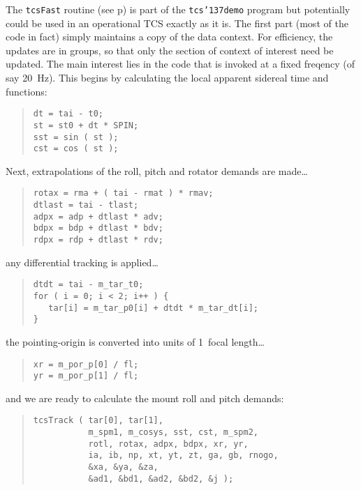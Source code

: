 \documentclass[12pt,fleqn,twoside]{article}
\renewcommand{\_}{{\tt\char'137}}     %
\begin{document}
The {\tt tcsFast} routine (see p\pageref{tcsFast})
is part of the {\tt tcs\_demo} program but
potentially could be used in an operational TCS exactly as it is.
The first part (most of the code in fact) simply maintains a copy of the
data context.  For efficiency,
the updates are in groups, so that only the section of
context of interest need be updated.  The main interest lies in the
code that is invoked at a fixed freqency (of say 20~Hz).  This begins
by calculating the local apparent sidereal time and functions:
\begin{quote}
\begin{small}
\begin{verbatim}
dt = tai - t0;
st = st0 + dt * SPIN;
sst = sin ( st );
cst = cos ( st );
\end{verbatim}\end{small}
\end{quote}
Next, extrapolations of the roll, pitch and
rotator demands are made\ldots
\begin{quote}
\begin{small}
\begin{verbatim}
rotax = rma + ( tai - rmat ) * rmav;
dtlast = tai - tlast;
adpx = adp + dtlast * adv;
bdpx = bdp + dtlast * bdv;
rdpx = rdp + dtlast * rdv;
\end{verbatim}\end{small}
\end{quote}
any differential tracking is applied\ldots
\begin{quote}
\begin{small}
\begin{verbatim}
dtdt = tai - m_tar_t0;
for ( i = 0; i < 2; i++ ) {
   tar[i] = m_tar_p0[i] + dtdt * m_tar_dt[i];
}
\end{verbatim}\end{small}
\end{quote}
the pointing-origin is converted into units of 1~focal length\ldots
\begin{quote}
\begin{small}
\begin{verbatim}
xr = m_por_p[0] / fl;
yr = m_por_p[1] / fl;
\end{verbatim}\end{small}
\end{quote}
and we are ready to calculate the mount roll and pitch demands:
\begin{quote}
\begin{small}
\begin{verbatim}
tcsTrack ( tar[0], tar[1],
           m_spm1, m_cosys, sst, cst, m_spm2,
           rotl, rotax, adpx, bdpx, xr, yr,
           ia, ib, np, xt, yt, zt, ga, gb, rnogo,
           &xa, &ya, &za,
           &ad1, &bd1, &ad2, &bd2, &j );
\end{verbatim}\end{small}
\end{quote}
\end{document}
